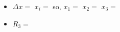 \documentclass[12pt]{report}
\newcommand{\ds}{\displaystyle}
\begin{document}
\begin{itemize}
\begin{itemize}

\item[] $\Delta x = $ \hspace{1in} $x_i = $ \hspace{1in} so, $x_1 =  $ \hspace{0.5in} $x_2 = $ \hspace{0.5in} $x_3 =$

\bigskip

\item[] $R_3 = $

\end{itemize}

\end{itemize} 



%
%
%
%
%
%
%
%
%
%
%
%
%
%
%
%
\end{document}
